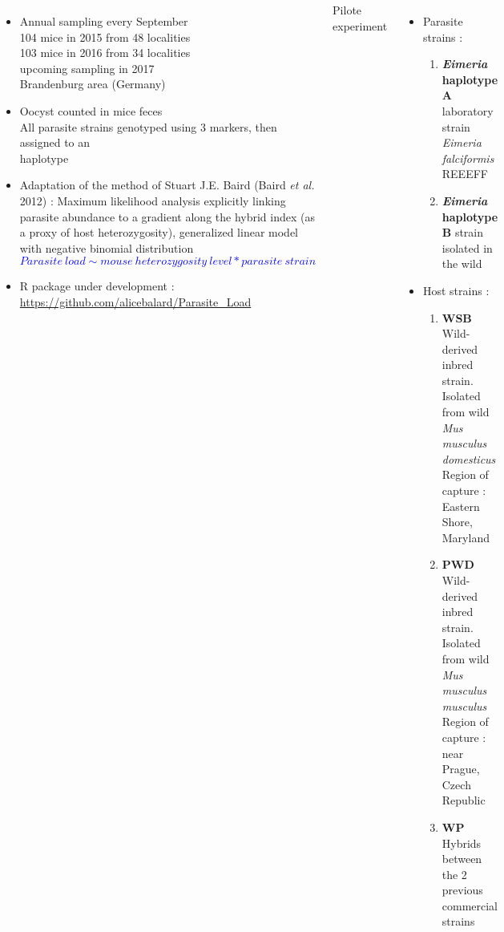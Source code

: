 \documentclass[30pt, a0paper, portrait, margin=0mm, innermargin=15mm,
               blockverticalspace=15mm, colspace=15mm, subcolspace=8mm]{tikzposter}
\begin{document}
\begin{columns}
{     \begin{itemize}

       \item{Annual sampling every September\\ 104 mice in 2015 from 48 localities\\ 103 mice in 2016 from 34 localities \\ upcoming sampling in 2017 \\ Brandenburg area (Germany)}
       \item{Oocyst counted in mice feces\\ All parasite strains genotyped using 3 markers, then assigned to an \\haplotype}
     
      \item Adaptation of the method of Stuart J.E. Baird (Baird \textit{et al.} 2012) : Maximum likelihood analysis explicitly linking parasite abundance to a gradient along the hybrid index (as a proxy of host heterozygosity), generalized linear model with negative binomial distribution \vspace{+1ex}
      \textcolor{blue}{\[Parasite\ load \sim mouse\ heterozygosity\ level * parasite\ strain  \]}\vspace{-2ex}%
      \item R package under development : \url{https://github.com/alicebalard/Parasite_Load}
      \end{itemize}
      }


      {Pilote experiment
      \begin{itemize}
      
      \item Parasite strains :
      
      \begin{enumerate}
      \item \textbf{\textit{Eimeria} haplotype A} laboratory strain \textit{Eimeria falciformis} REEEFF
      \item \textbf{\textit{Eimeria} haplotype B} strain isolated in the wild 
      \end{enumerate}
      
      \item Host strains :
      
      \begin{enumerate}
      \item \textbf{WSB} Wild-derived inbred strain. Isolated from wild \textit{Mus musculus domesticus}\\ Region of capture : Eastern Shore, Maryland
      \item \textbf{PWD} Wild-derived inbred strain. Isolated from wild \textit{Mus musculus musculus}\\ Region of capture : near Prague, Czech Republic
      \item \textbf{WP} Hybrids between the 2 previous commercial strains
      \end{enumerate}
      

\end{itemize}}
\end{columns}
\end{document}
